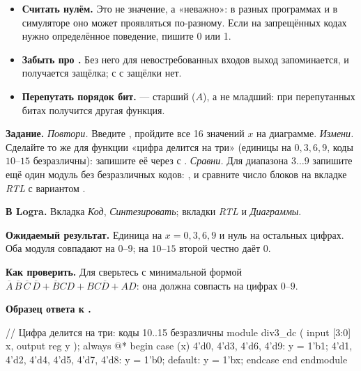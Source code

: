 \begin{warnbox}
\begin{itemize}
  \item \textbf{Считать  нулём.} Это не значение, а «неважно»:
        в разных программах и в симуляторе оно может проявляться по-разному.
        Если на запрещённых кодах нужно определённое поведение, пишите 0 или 1.
  \item \textbf{Забыть про .} Без него для невостребованных
        входов выход запоминается, и получается защёлка; с 
        с  защёлки нет.
  \item \textbf{Перепутать порядок бит.}  --- старший ($A$), а
        не младший: при перепутанных битах получится другая функция.
\end{itemize}
\end{warnbox}

\begin{diybox}
\textbf{Задание.}  \emph{Повтори.} Введите ,
пройдите все 16 значений $x$ на диаграмме.  \emph{Измени.}
Сделайте то же для функции «цифра делится на три» (единицы на
$0,3,6,9$, коды $10$--$15$ безразличны): запишите её через 
с .  \emph{Сравни.} Для диапазона $3\ldots9$
запишите ещё один модуль без безразличных кодов:
, и сравните число блоков на вкладке \emph{RTL}
с вариантом .

\textbf{В Logra.} Вкладка \emph{Код}, \emph{Синтезировать}; вкладки
\emph{RTL} и \emph{Диаграммы}.

\textbf{Ожидаемый результат.}  Единица на $x=0,3,6,9$ и нуль
на остальных цифрах.  Оба модуля совпадают на $0$--$9$; на
$10$--$15$ второй честно даёт $0$.

\textbf{Как проверить.} Для  сверьтесь с минимальной формой
$\overline{A}\,\overline{B}\,\overline{C}\,\overline{D}+\overline{B}CD+BC\overline{D}+AD$:
она должна совпасть на цифрах $0$--$9$.
\end{diybox}

\textbf{Образец ответа к .}

\begin{vcode}
// Цифра делится на три: коды 10..15 безразличны
module div3_dc (
    input      [3:0] x,
    output reg       y
);
    always @* begin
        case (x)
            4'd0, 4'd3, 4'd6, 4'd9:                 y = 1'b1;
            4'd1, 4'd2, 4'd4, 4'd5, 4'd7, 4'd8:     y = 1'b0;
            default:                                y = 1'bx;
        endcase
    end
endmodule
\end{vcode}

